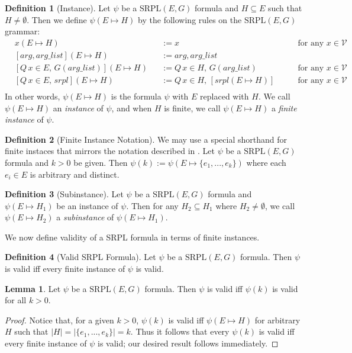 \documentclass[12pt]{article}
\theoremstyle{definition}
\newtheorem{lemma}{Lemma}
\newtheorem{definition}{Definition}
\theoremstyle{remark}
\newcommand{\SRPL}{\text{SRPL}}
\begin{document}
\begin{definition}[Instance]
  Let $\psi$ be a $\SRPL(E,G)$ formula and $H \subseteq E$ such that $H \neq \emptyset$.  Then we define $\psi(E \mapsto H)$ by the following rules on the $\SRPL(E,G)$ grammar:
  \begin{align*}
    &x(E \mapsto H)& &:= x \qquad &\text{for any } x \in \mathcal{V}\\
    &[arg,arg\_list](E \mapsto H)& &:= arg,arg\_list\\
    &[Q \, x \in E, \, G(arg\_list)](E \mapsto H)& &:= Q \, x \in H, \, G(arg\_list) \qquad &\text{for any } x \in \mathcal{V}\\
    &[Q \, x \in E, \, srpl](E \mapsto H)& &:=Q \, x \in H, \, [srpl(E \mapsto H)]  \qquad &\text{for any } x \in \mathcal{V}\\
  \end{align*}
  In other words, $\psi(E \mapsto H)$ is the formula $\psi$ with $E$ replaced with $H$.  We call $\psi(E \mapsto H)$ an \textit{instance} of $\psi$, and when $H$ is finite, we call $\psi(E \mapsto H)$ a \textit{finite instance} of $\psi$.
\end{definition}

\begin{definition}[Finite Instance Notation]
  We may use a special shorthand for finite instaces that mirrors the notation described in \cite{goel2021symmetry}.  Let $\psi$ be a $\SRPL(E,G)$ formula and $k>0$ be given.  Then $\psi(k) := \psi(E \mapsto \{e_1,...,e_k\})$ where each $e_i \in E$ is arbitrary and distinct.
\end{definition}

\begin{definition}[Subinstance]
  Let $\psi$ be a $\SRPL(E,G)$ formula and $\psi(E \mapsto H_1)$ be an instance of $\psi$.  Then for any $H_2 \subseteq H_1$ where $H_2 \neq \emptyset$, we call $\psi(E \mapsto H_2)$ a \textit{subinstance} of $\psi(E \mapsto H_1)$.
\end{definition}

We now define validity of a SRPL formula in terms of finite instances.

\begin{definition}[Valid SRPL Formula]
  Let $\psi$ be a $\SRPL(E,G)$ formula.  Then $\psi$ is valid iff every finite instance of $\psi$ is valid.
\end{definition}

\begin{lemma}
  \label{lem:valid-all-k}
  Let $\psi$ be a $\SRPL(E,G)$ formula.  Then $\psi$ is valid iff $\psi(k)$ is valid for all $k>0$.
\end{lemma}
\begin{proof}
  Notice that, for a given $k>0$, $\psi(k)$ is valid iff $\psi(E \mapsto H)$ for arbitrary $H$ such that $|H|=|\{e_1,...,e_k\}|=k$.  Thus it follows that every $\psi(k)$ is valid iff every finite instance of $\psi$ is valid; our desired result follows immediately.
\end{proof}
\end{document}
